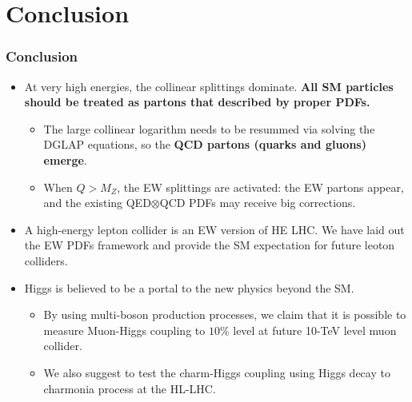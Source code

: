 \documentclass[aspectratio=169]{beamer}
\begin{document}
\section{Conclusion}
\begin{frame}
	\frametitle{Conclusion}
	\begin{itemize}
		\item At very high energies, the collinear splittings dominate. {\bf All SM particles should be treated as partons that described by proper PDFs.}
		\begin{itemize}
			\item The large collinear logarithm needs to be resummed via solving the DGLAP equations, so the {\bf QCD partons (quarks and gluons) emerge}.
			\item When $Q>M_Z$, the EW splittings are activated: the EW partons appear, and the existing QED$\otimes$QCD PDFs may receive big corrections.
		\end{itemize}
		\item A high-energy lepton collider is an EW version of HE LHC. We have laid out the EW PDFs framework and provide the SM expectation for future leoton colliders.
		\item Higgs is believed to be a portal to the new physics beyond the SM. 
		\begin{itemize}
			\item By using multi-boson production processes, we claim that it is possible to measure Muon-Higgs coupling to $10\%$ level at future 10-TeV level muon collider.
			\item We also suggest to test the charm-Higgs coupling using Higgs decay to charmonia process at the HL-LHC.
		\end{itemize}
	\end{itemize}

	

\end{frame}

\end{document}
